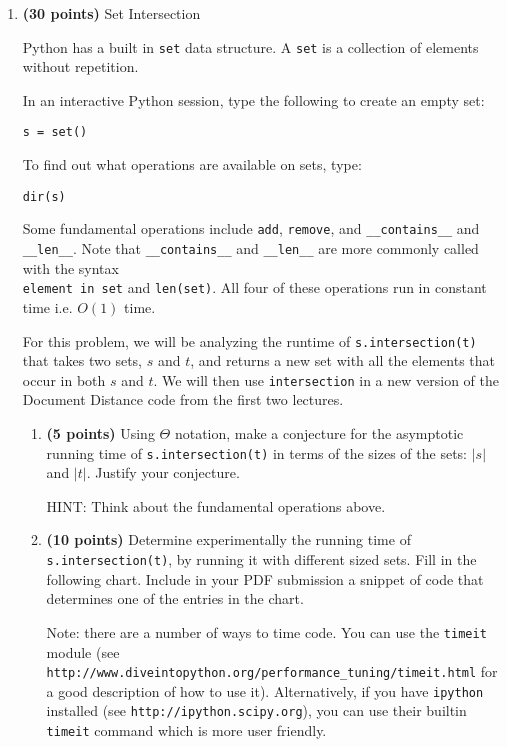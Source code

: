 \documentclass[12pt,twoside]{article}
\begin{document}
\begin{enumerate}
\begin{enumerate}
  \end{enumerate}

\item {\bf (30 points)} Set Intersection

  Python has a built in \texttt{set} data structure. A \texttt{set} is
  a collection of elements without repetition.

  In an interactive Python session, type the following to create an
  empty set:

  \texttt{s = set()}

  To find out what operations are available on sets, type:

  \texttt{dir(s)}

  Some fundamental operations include \texttt{add}, \texttt{remove},
  and \texttt{\_\_contains\_\_} and \texttt{\_\_len\_\_}. Note that
  \texttt{\_\_contains\_\_} and \texttt{\_\_len\_\_} are more commonly
  called with the syntax \\ \mbox{\texttt{element in set}} and
  \texttt{len(set)}.  All four of these operations run in constant
  time i.e. $O(1)$ time.
 
  For this problem, we will be analyzing the runtime of
  \texttt{s.intersection(t)} that takes two sets, $s$ and $t$, and
  returns a new set with all the elements that occur in both $s$ and
  $t$.  We will then use \texttt{intersection} in a new version of the
  Document Distance code from the first two lectures.

  \begin{enumerate}
    
  \item {\bf (5 points)} Using $\Theta$ notation, make a conjecture
    for the asymptotic running time of \texttt{s.intersection(t)} in
    terms of the sizes of the sets: $|s|$ and $|t|$. Justify your
    conjecture.

    HINT: Think about the fundamental operations above.
    
  \item {\bf (10 points)} Determine experimentally the running time of
  \texttt{s.intersection(t)}, by running it with different sized
  sets. Fill in the following chart. Include in your PDF submission a
  snippet of code that determines one of the entries in the chart.

  Note: there are a number of ways to time code. You can use the
  \texttt{timeit} module (see
  \texttt{http://www.diveintopython.org/performance\_tuning/timeit.html}
  for a good description of how to use it). Alternatively, if you have
  \texttt{ipython} installed (see \texttt{http://ipython.scipy.org}),
  you can use their builtin \texttt{timeit} command which is more user
  friendly.


\end{enumerate}
\end{enumerate}
\end{document}
